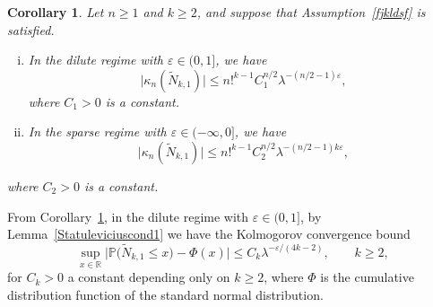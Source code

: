 \documentclass[12pt]{article}
\newcommand{\R}{\mathbb{R}}
\newcommand{\IP}{\mathbb{P}}
\newtheorem{corollary}[prop]{Corollary}
\numberwithin{equation}{section}
\begin{document}
 \begin{corollary}
  \label{jfklds}
  Let $n\geq 1$ and $k\geq 2$,
  and suppose that Assumption~\ref{fjkldsf} is satisfied. 
  \begin{enumerate}[i)]
    \item In the dilute regime with $\varepsilon \in (0,1]$, we have
\begin{equation}
\label{standkop-1}
\big|\kappa_n(\widetilde{N}_{k,1})\big|\leq n!^{k-1}
C_1^{n/2}
\lambda^{-(n/2-1)\varepsilon },
\end{equation}
  where $C_1 > 0$ is a constant.
\item
  In the sparse regime with $\varepsilon \in (-\infty , 0]$, we have
  \begin{equation}
    \label{standkop-2}
    \big|\kappa_n(\widetilde{N}_{k,1})\big|\leq n!^{k-1}
    C_2^{n/2}
    \lambda^{-(n/2-1) k \varepsilon }, 
\end{equation}
  \end{enumerate}
 where $C_2 > 0$ is a constant.
\end{corollary}
 From Corollary~\ref{jfklds}, 
 in the dilute regime with $\varepsilon \in (0,1]$,
   by Lemma~\ref{Statuleviciuscond1}
   we have the Kolmogorov convergence bound 
\begin{equation}
\nonumber
\sup_{x\in\R}\big|\IP\big(\widetilde{N}_{k,1} \leq x\big)-\Phi(x)\big|\leq C_k \lambda^{ - \varepsilon  / ( 4k-2 )},
\qquad
  k\geq 2, 
\end{equation}
for $C_k>0$ a constant depending only on $k\geq 2$,
where $\Phi$ is the cumulative distribution function of the standard normal distribution. 
\end{document}
